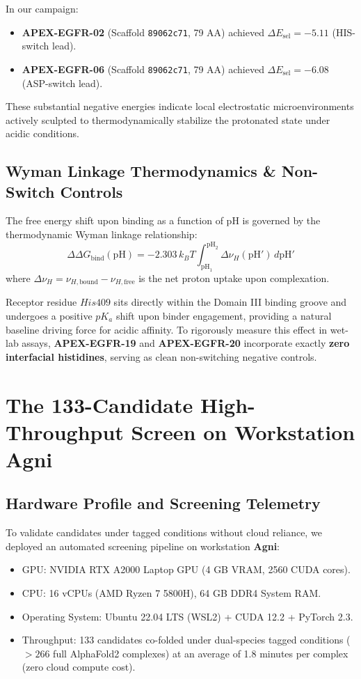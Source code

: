 \documentclass[11pt]{article}
\begin{document}
In our campaign:
\begin{itemize}
    \item \textbf{APEX-EGFR-02} (Scaffold \texttt{89062c71}, 79 AA) achieved $\Delta E_{\text{sel}} = -5.11$ (HIS-switch lead).
    \item \textbf{APEX-EGFR-06} (Scaffold \texttt{89062c71}, 79 AA) achieved $\Delta E_{\text{sel}} = -6.08$ (ASP-switch lead).
\end{itemize}
These substantial negative energies indicate local electrostatic microenvironments actively sculpted to thermodynamically stabilize the protonated state under acidic conditions.

\subsection{Wyman Linkage Thermodynamics \& Non-Switch Controls}
The free energy shift upon binding as a function of pH is governed by the thermodynamic Wyman linkage relationship:
\begin{equation}
    \Delta\Delta G_{\text{bind}}(\text{pH}) = -2.303 \, k_B T \int_{\text{pH}_1}^{\text{pH}_2} \Delta \nu_H(\text{pH}') \, d\text{pH}'
\end{equation}
where $\Delta \nu_H = \nu_{H,\text{bound}} - \nu_{H,\text{free}}$ is the net proton uptake upon complexation.

Receptor residue $His409$ sits directly within the Domain III binding groove and undergoes a positive $pK_a$ shift upon binder engagement, providing a natural baseline driving force for acidic affinity. To rigorously measure this effect in wet-lab assays, \textbf{APEX-EGFR-19} and \textbf{APEX-EGFR-20} incorporate exactly \textbf{zero interfacial histidines}, serving as clean non-switching negative controls.

\section{The 133-Candidate High-Throughput Screen on Workstation Agni}

\subsection{Hardware Profile and Screening Telemetry}
To validate candidates under tagged conditions without cloud reliance, we deployed an automated screening pipeline on workstation \textbf{Agni}:
\begin{itemize}
    \item GPU: NVIDIA RTX A2000 Laptop GPU (4 GB VRAM, 2560 CUDA cores).
    \item CPU: 16 vCPUs (AMD Ryzen 7 5800H), 64 GB DDR4 System RAM.
    \item Operating System: Ubuntu 22.04 LTS (WSL2) + CUDA 12.2 + PyTorch 2.3.
    \item Throughput: 133 candidates co-folded under dual-species tagged conditions ($>266$ full AlphaFold2 complexes) at an average of 1.8 minutes per complex (zero cloud compute cost).
\end{itemize}
\end{document}

